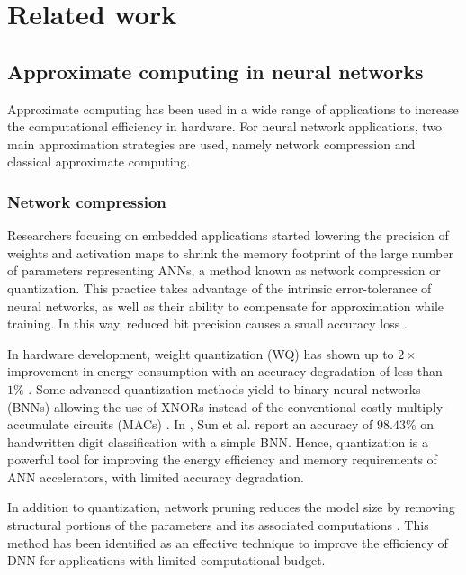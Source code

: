 \section{Related work}
\label{sec:related_work}
\subsection{Approximate computing in neural networks}
Approximate computing has been used in a wide range of applications to increase the computational efficiency in hardware\cite{han2013approximate}. For neural network applications, two main approximation strategies are used, namely network compression and classical approximate computing\cite{bouvier2019spiking}.

\subsubsection{Network compression}
Researchers focusing on embedded applications started lowering the precision of weights and activation maps to shrink the memory footprint of the large number of parameters representing ANNs, a method known as network compression or quantization. This practice takes advantage of the intrinsic error-tolerance of neural networks, as well as their ability to compensate for approximation while training. In this way, reduced bit precision causes a small accuracy loss \cite{courbariaux2015binaryconnect, han2015deep, hubara2017quantized, rastegari2016xnor}.

In hardware development, weight quantization (WQ) has shown up to $2\times$ improvement in energy consumption with an accuracy degradation of less than $1\%$ \cite{moons20160, whatmough201714}. Some advanced quantization methods yield to binary neural networks (BNNs) allowing the use of XNORs instead of the conventional costly multiply-accumulate circuits (MACs) \cite{rastegari2016xnor}. In \cite{sun2018xnor}, Sun et al. report an accuracy of $98.43\%$ on handwritten digit classification with a simple BNN. Hence, quantization is a powerful tool for improving the energy efficiency and memory requirements of ANN accelerators, with limited accuracy degradation.

In addition to quantization, network pruning reduces the model size by removing structural portions of the parameters and its associated computations \cite{lecun1989optimal,hassibi1992second}. This method has been identified as an effective technique to improve the efficiency of DNN for applications with limited computational budget\cite{molchanov2016pruning,li2016pruning, liu2018rethinking}.

